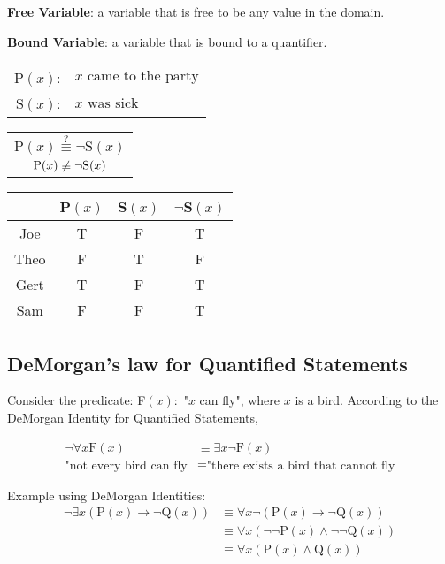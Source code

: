 \documentclass{article}
\begin{document}
\noindent \textbf{Free Variable}: a variable that is free to be any value in the domain.

\noindent \textbf{Bound Variable}: a variable that is bound to a quantifier.

\begin{center}
  \begin{tabular}{rl}
    \(\text{P}(x)\): & \(x \text{ came to the party}\) \\
    \(\text{S}(x)\): & \(x \text{ was sick}\)          \\
  \end{tabular}
  \qquad
  \begin{tabular}{c}
    \(\text{P}(x) \overset{?}{\equiv} \lnot \text{S}(x)\) \\
    \(\text{P}(x) \centernot{\equiv} \lnot \text{S}(x)\)
  \end{tabular}
  \qquad
  \begin{tabular}{c|ccc}
         & P\((x)\) & S\((x)\) & \(\lnot\)S\((x)\) \\
    \hline
    Joe  & T        & F        & T                 \\
    Theo & F        & T        & F                 \\
    Gert & T        & F        & T                 \\
    Sam  & F        & F        & T
  \end{tabular}
\end{center}

\subsection{DeMorgan's law for Quantified Statements}


Consider the predicate: F\((x):\) "\(x\) can fly", where \(x\) is a bird.
According to the DeMorgan Identity for Quantified Statements,

\begin{align*}
  \lnot \forall x \text{F}(x)    & \equiv \exists x \lnot \text{F}(x)                 \\
  \text{"not every bird can fly} & \equiv \text{"there exists a bird that cannot fly}
\end{align*}

Example using DeMorgan Identities:
\begin{align*}
  \lnot \exists x (\text{P}(x) \rightarrow \lnot \text{Q}(x)) & \equiv \forall x \lnot (\text{P}(x) \rightarrow \lnot \text{Q}(x))       \\
                                                              & \equiv \forall x (\lnot \lnot \text{P}(x) \land \lnot \lnot \text{Q}(x)) \\
                                                              & \equiv \forall x (\text{P}(x) \land \text{Q}(x))
\end{align*}
\end{document}
